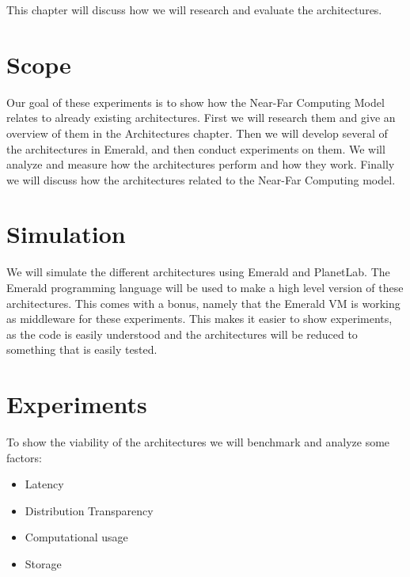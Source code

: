 This chapter will discuss how we will research and evaluate the architectures.


\section{Scope}
Our goal of these experiments is to show how the Near-Far Computing Model relates to already existing architectures. First we will research them and give an overview of them in the Architectures chapter. Then we will develop several of the architectures in Emerald, and then conduct experiments on them. We will analyze and measure how the architectures perform and how they work. Finally we will discuss how the architectures related to the Near-Far Computing model.




\section{Simulation}
We will simulate the different architectures using Emerald and PlanetLab. The Emerald programming language will be used to make a high level version of these architectures. This comes with a bonus, namely that the Emerald VM is working as middleware for these experiments. This makes it easier to show experiments, as the code is easily understood and the architectures will be reduced to something that is easily tested.








\section{Experiments}
To show the viability of the architectures we will benchmark and analyze some factors:
\begin{itemize}
    \item Latency
    \item Distribution Transparency
    \item Computational usage
    \item Storage
\end{itemize}




